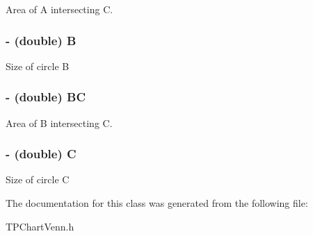 Area of A intersecting C. \hypertarget{interface_t_p_chart_venn_825f1948fd43e6c8ab550cd6eff0afd2}{
\subsubsection[{B}]{\setlength{\rightskip}{0pt plus 5cm}- (double) B}}
\label{interface_t_p_chart_venn_825f1948fd43e6c8ab550cd6eff0afd2}


Size of circle B \hypertarget{interface_t_p_chart_venn_85f8bef77745132af4fadb2d8539d231}{
\subsubsection[{BC}]{\setlength{\rightskip}{0pt plus 5cm}- (double) BC}}
\label{interface_t_p_chart_venn_85f8bef77745132af4fadb2d8539d231}


Area of B intersecting C. \hypertarget{interface_t_p_chart_venn_9541f2b91262bf851ca77cb32ce77e02}{
\subsubsection[{C}]{\setlength{\rightskip}{0pt plus 5cm}- (double) C}}
\label{interface_t_p_chart_venn_9541f2b91262bf851ca77cb32ce77e02}


Size of circle C 

The documentation for this class was generated from the following file:\begin{CompactItemize}
\item 
TPChartVenn.h\end{CompactItemize}
